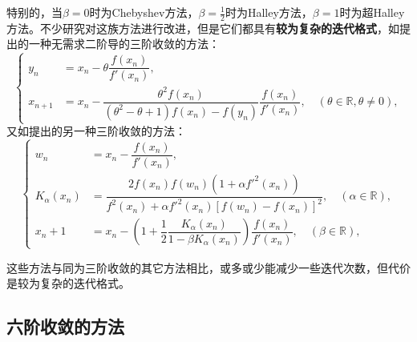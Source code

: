 特别的，当$\beta=0$时为Chebyshev方法，$\beta=\frac{1}{2}$时为Halley方法，$\beta=1$时为超Halley方法。不少研究对这族方法进行改进，但是它们都具有\textbf{较为复杂的迭代格式}，如\cite{kou2006modified}提出的一种无需求二阶导的三阶收敛的方法：
\begin{equation}
    \begin{cases}
        y_n &= x_n - \theta\dfrac{f(x_n)}{f'(x_n)}, \\
        x_{n+1} &= x_n - \dfrac{\theta^2 f(x_n)}{(\theta^2 - \theta + 1)f(x_n) - f(y_n)}\dfrac{f(x_n)}{f'(x_n)},\quad (\theta \in \mathbb{R}, \theta \neq 0),
    \end{cases}
\end{equation}
又如\cite{chun2007some}提出的另一种三阶收敛的方法：
\begin{equation}
    \begin{cases}
        w_n & = x_n - \dfrac{f(x_n)}{f'(x_n)}, \\
        K_\alpha(x_n) & = \dfrac{2f(x_n)f(w_n)(1+\alpha f'^2(x_n))}{f^2(x_n)+\alpha f'^2(x_n)[f(w_n)-f(x_n)]^2}, \quad (\alpha \in \mathbb{R}), \\
        x_n+1 & = x_n - \left(1+\dfrac{1}{2}\dfrac{K_\alpha(x_n)}{1-\beta K_\alpha(x_n)}\right) \dfrac{f(x_n)}{f'(x_n)}, \quad (\beta \in \mathbb{R}),
    \end{cases}
\end{equation}


这些方法与同为三阶收敛的其它方法相比，或多或少能减少一些迭代次数，但代价是较为复杂的迭代格式。

\subsection{六阶收敛的方法}

